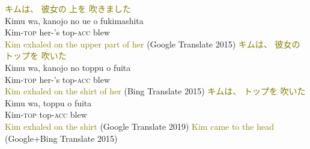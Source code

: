 \documentclass[a4paper,landscape,headrule,footrule,xetex]{foils}
\newcommand{\tra}[1]{\textcolor{olive}{\textsf{#1}}}
\begin{document}

\begin{exe}
  \ex {}
  \trans \glll \tra{キムは、} \tra{彼女の} \tra{上を} \tra{吹きました} \\
  {Kimu wa,} {kanojo no} {ue o} fukimashita \\
  Kim-\textsc{top} her-'s top-\textsc{acc} blew \\  
  \trans  \tra{Kim exhaled on the upper part of her} (Google Translate
  2015)
 \trans \glll \tra{キムは、} \tra{彼女の} \tra{トップを} \tra{吹いた} \\
  {Kimu wa,} {kanojo no} {toppu o} fuita \\
  Kim-\textsc{top} her-'s top-\textsc{acc} blew \\  
  \trans  \tra{Kim exhaled on the shirt of her} (Bing Translate 2015)
 \trans \glll \tra{キムは、} \tra{トップを} \tra{吹いた} \\
  {Kimu wa,} {toppu o} fuita \\
  Kim-\textsc{top}  top-\textsc{acc} blew \\  
  \trans  \tra{Kim exhaled on the shirt} (Google Translate 2019)
  \ex {}
  \trans \tra{Kim came to the head} (Google+Bing Translate 2015)
\end{exe}

\makexeCJKinactive
\end{document}
